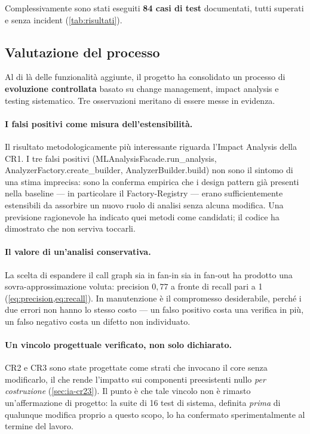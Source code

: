 \documentclass[11pt,a4paper]{article}
\makeatletter
\newif\ifmark@prevlower
\def\mark@casebreak#1{%
  \ifcat\noexpand#1\relax
    \mark@prevlowerfalse
  \else
    \ifnum`#1=\uccode`#1\relax
      \ifmark@prevlower\allowbreak\fi
      \mark@prevlowerfalse
    \else
      \ifnum`#1=\lccode`#1\relax
        \mark@prevlowertrue
      \else
        \mark@prevlowerfalse
      \fi
    \fi
  \fi}
\def\mark@brk#1{%
  \ifx#1\mark@stop
    \let\mark@next\relax
  \else
    \mark@casebreak{#1}%
    #1%
    \ifx#1.\allowbreak\else
      \ifx#1\_\allowbreak\else
        \ifx#1/\allowbreak\else
          \ifx#1(\allowbreak\fi
        \fi
      \fi
    \fi
    \let\mark@next\mark@brk
  \fi
  \mark@next}
\def\mark@stop{\mark@stop}
\DeclareRobustCommand{\mark@code}[1]{%
  \ifmmode
    \text{\ttfamily\small\mark@prevlowerfalse\mark@brk#1\mark@stop}%
  \else
    {\ttfamily\small\mark@prevlowerfalse\mark@brk#1\mark@stop}%
  \fi}
\DeclareRobustCommand{\meth}[1]{\mark@code{#1}}
\def\mark@code#1{#1}%
\def\meth#1{#1}%
\makeatother
\begin{document}
Complessivamente sono stati eseguiti \textbf{84 casi di test} documentati, tutti
superati e senza incident (\cref{tab:risultati}).

\subsection{Valutazione del processo}
\label{sec:valutazione}

Al di l\`a delle funzionalit\`a aggiunte, il progetto ha consolidato un processo
di \textbf{evoluzione controllata} basato su change management, impact analysis e
testing sistematico. Tre osservazioni meritano di essere messe in evidenza.

\paragraph{I falsi positivi come misura dell'estensibilit\`a.}
Il risultato metodologicamente pi\`u interessante riguarda l'Impact Analysis
della CR1. I tre falsi positivi (\meth{MLAnalysisFacade.run\_analysis},
\meth{AnalyzerFactory.create\_builder}, \meth{AnalyzerBuilder.build}) non sono
il sintomo di una stima imprecisa: sono la conferma empirica che i design
pattern gi\`a presenti nella baseline --- in particolare il Factory-Registry ---
erano sufficientemente estensibili da assorbire un nuovo ruolo di analisi senza
alcuna modifica. Una previsione ragionevole ha indicato quei metodi come
candidati; il codice ha dimostrato che non serviva toccarli.

\paragraph{Il valore di un'analisi conservativa.}
La scelta di espandere il call graph sia in fan-in sia in fan-out ha prodotto una
sovra-approssimazione voluta: precision $0{,}77$ a fronte di recall pari a 1
(\cref{eq:precision,eq:recall}). In manutenzione \`e il compromesso desiderabile,
perch\'e i due errori non hanno lo stesso costo --- un falso positivo costa una
verifica in pi\`u, un falso negativo costa un difetto non individuato.

\paragraph{Un vincolo progettuale verificato, non solo dichiarato.}
CR2 e CR3 sono state progettate come strati che invocano il core senza
modificarlo, il che rende l'impatto sui componenti preesistenti nullo \emph{per
costruzione} (\cref{sec:ia-cr23}). Il punto \`e che tale vincolo non \`e rimasto
un'affermazione di progetto: la suite di 16 test di sistema, definita
\emph{prima} di qualunque modifica proprio a questo scopo, lo ha confermato
sperimentalmente al termine del lavoro.
\end{document}
